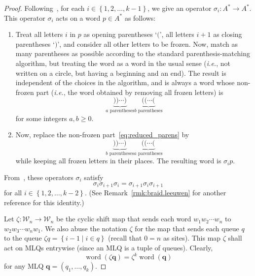 \documentclass[reqno]{amsart}
\newcommand{\0}{\phantom{c}}
\DeclareMathOperator{\word}{word} %
\newcommand{\qq}{\mathbf{q}}
\newcommand{\mcW}{\mathcal{W}}
\newcommand{\set}[1]{\left\{ #1 \right\}}
\newcommand{\tup}[1]{\left( #1 \right)}
\theoremstyle{plain}
\theoremstyle{definition}
\numberwithin{equation}{section}
\begin{document}
\begin{proof}
Following~\cite[\S5.5]{Loth}, for each $i \in \set{1, 2, \ldots, k-1}$, we give an operator
$\sigma_i \colon A^* \to A^*$.
This operator $\sigma_i$ acts on a word $p \in A^*$ %
as follows:
\begin{enumerate}
 \item Treat all letters $i$ in $p$ as opening parentheses `$($',
       all letters $i+1$ as closing parentheses `$)$',
       and consider all other letters to be frozen.
       Now, match as many parentheses as possible
       according to the standard parenthesis-matching algorithm,
       but treating the word as a word in the usual sense
       (\textit{i.e.}, not written on a circle, but having a beginning
       and an end).
       The result is independent of the choices in the algorithm,
       and is always a word whose non-frozen
       part (\textit{i.e.}, the word obtained by removing
       all frozen letters) is
       \begin{equation}
       \label{eq:reduced_parens}
       \underbrace{))\cdots)}_{a\text{ parentheses}}
       \underbrace{((\cdots(}_{b\text{ parentheses}}
       \end{equation}
       for some integers $a, b \geq 0$.
 \item Now, replace the non-frozen part~\eqref{eq:reduced_parens} by
       \[
       \underbrace{))\cdots)}_{b\text{ parentheses}}
       \underbrace{((\cdots(}_{a\text{ parentheses}}
       \]
       while keeping all frozen letters in their places.
       The resulting word is $\sigma_i p$.
\end{enumerate}
From~\cite[Eq.~(5.6.3)]{Loth}, these operators
$\sigma_i$ satisfy
\begin{equation}
 \sigma_i \sigma_{i+1} \sigma_i
 = \sigma_{i+1} \sigma_i \sigma_{i+1}
 \label{pf.prop:braid.loth-eq}
\end{equation}
for all $i \in \set{1, 2, \ldots, k-2}$.
(See Remark~\ref{rmk:braid.leeuwen} for another reference for this identity.)

Let $\zeta \colon \mcW_n \to \mcW_n$ be the cyclic shift map that sends each word $w_1 w_2 \cdots w_n$ to $w_2 w_3 \cdots w_n w_1$.
We also abuse the notation $\zeta$ for the map that sends each queue $q$ to the queue $\zeta q = \set{ i - 1 \mid i \in q }$ (recall that $0 = n$ as sites).
This map $\zeta$ shall act on MLQs entrywise (since an MLQ is a tuple of queues).
Clearly,
\begin{equation}
 \word(\zeta \qq) = \zeta^k \word(\qq)
 \label{pf.prop:braid.word-zeta}
\end{equation}
for any MLQ $\qq = (q_1, \ldots, q_k)$.


\end{proof}
\end{document}
